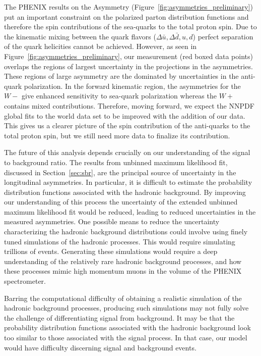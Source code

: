 The PHENIX results on the Asymmetry (Figure~\ref{fig:asymmetries_preliminary})
put an important constraint on the polarized parton distribution functions and
therefore the spin contributions of the sea-quarks to the total proton spin. Due
to the kinematic mixing between the quark flavors ($\Delta\bar{u},
\Delta\bar{d}, u, d$) perfect separation of the quark helicities cannot be
achieved. However, as seen in Figure~\ref{fig:asymmetries_preliminary}, our
measurement (red boxed data points) overlaps the regions of largest uncertainty
in the projections in the asymmetries. These regions of large asymmetry are the
dominated by uncertainties in the anti-quark polarization. In the forward
kinematic region, the asymmetries for the $W-$ give enhanced sensitivity to
sea-quark polarization whereas the $W+$ contains mixed contributions.
Therefore, moving forward, we expect the NNPDF global fits to the world data set
to be improved with the addition of our data. This gives us a clearer picture of
the spin contribution of the anti-quarks to the total proton spin, but we still
need more data to finalize its contribution.

The future of this analysis depends crucially on our understanding of the signal
to background ratio. The results from unbinned maximum likelihood fit, discussed
in Section~\ref{sec:sbr}, are the principal source of uncertainty in the
longitudinal asymmetries. In particular, it is difficult to estimate the
probability distribution functions associated with the hadronic background. By
improving our understanding of this process the uncertainty of the extended
unbinned maximum likelihood fit would be reduced, leading to reduced
uncertainties in the measured asymmetries. One possible means to reduce the
uncertainty characterizing the hadronic background distributions could involve
using finely tuned simulations of the hadronic processes. This would require
simulating trillions of events. Generating these simulations would require a
deep understanding of the relatively rare hadronic background processes, and how
these processes mimic high momentum muons in the volume of the PHENIX
spectrometer.

Barring the computational difficulty of obtaining a realistic simulation of the
hadronic background processes, producing such simulations may not fully solve the
challenge of differentiating signal from background. It may be that the
probability distribution functions associated with the hadronic background look
too similar to those associated with the signal process. In that case, our model
would have difficulty discerning signal and background events.

